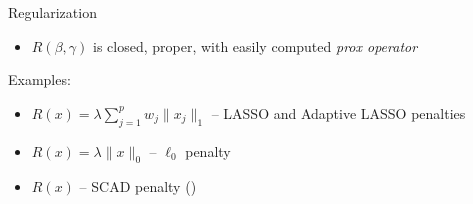\documentclass[8pt]{beamer}
\begin{document}
\begin{frame}{Regularization}
\begin{itemize}
	\item $R(\beta, \gamma)$ is closed, proper, with easily computed \textit{prox operator}
\end{itemize}


Examples: 
\begin{itemize}
	\item $R(x) = \lambda\sum_{j=1}^p w_j\|x_j\|_1$ -- LASSO and Adaptive LASSO penalties \cite{Krishna2008,Lin2013}
	\item $R(x) = \lambda \|x\|_0$ -- $\ell_0$ penalty \cite{Vaida2005,Jones2011}
	\item $R(x)$ -- SCAD penalty (\cite{Fan2001,Fan2012})
\end{itemize}


\end{frame}
\end{document}
